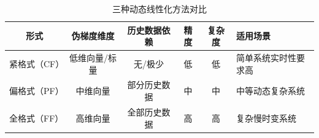     \begin{table}[htbp]
    \small
    \centering
    \caption{三种动态线性化方法对比}
    \begin{tabularx}{\linewidth}{cccccX}
        \toprule
        形式 & 伪梯度维度 & 历史数据依赖 & 精度 & 复杂度 & 适用场景 \\
        \midrule
        紧格式（CF） & 低维向量/标量 & 无/极少 & 低 & 低 & 简单系统实时性要求高 \\
        偏格式（PF） & 中维向量 & 部分历史数据 & 中 & 中 & 中等动态复杂系统 \\
        全格式（FF） & 高维向量 & 全部历史数据 & 高 & 高 & 复杂慢时变系统 \\
        \bottomrule
    \end{tabularx}
    \label{tab:dl_methods_compare}
    \end{table}

